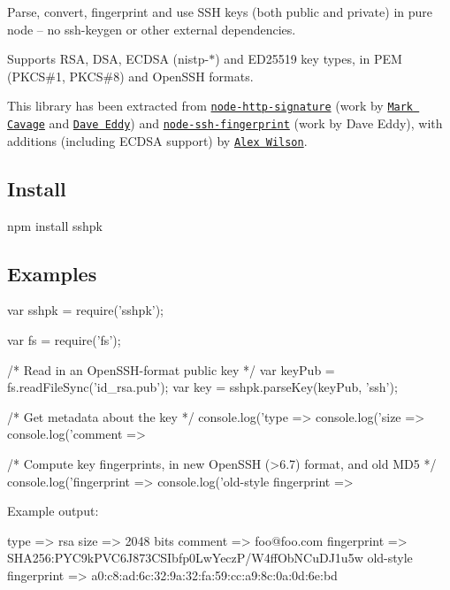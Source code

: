 Parse, convert, fingerprint and use S\+SH keys (both public and private) in pure node -- no {\ttfamily ssh-\/keygen} or other external dependencies.

Supports R\+SA, D\+SA, E\+C\+D\+SA (nistp-\/$\ast$) and E\+D25519 key types, in P\+EM (P\+K\+CS\#1, P\+K\+CS\#8) and Open\+S\+SH formats.

This library has been extracted from \href{https://github.com/joyent/node-http-signature}{\tt {\ttfamily node-\/http-\/signature}} (work by \href{https://github.com/mcavage}{\tt Mark Cavage} and \href{https://github.com/bahamas10}{\tt Dave Eddy}) and \href{https://github.com/bahamas10/node-ssh-fingerprint}{\tt {\ttfamily node-\/ssh-\/fingerprint}} (work by Dave Eddy), with additions (including E\+C\+D\+SA support) by \href{https://github.com/arekinath}{\tt Alex Wilson}.

\subsection*{Install }


\begin{DoxyCode}
npm install sshpk
\end{DoxyCode}


\subsection*{Examples }


\begin{DoxyCode}
var sshpk = require('sshpk');

var fs = require('fs');

/* Read in an OpenSSH-format public key */
var keyPub = fs.readFileSync('id\_rsa.pub');
var key = sshpk.parseKey(keyPub, 'ssh');

/* Get metadata about the key */
console.log('type => %
console.log('size => %
console.log('comment => %

/* Compute key fingerprints, in new OpenSSH (>6.7) format, and old MD5 */
console.log('fingerprint => %
console.log('old-style fingerprint => %
\end{DoxyCode}


Example output\+:


\begin{DoxyCode}
type => rsa
size => 2048 bits
comment => foo@foo.com
fingerprint => SHA256:PYC9kPVC6J873CSIbfp0LwYeczP/W4ffObNCuDJ1u5w
old-style fingerprint => a0:c8:ad:6c:32:9a:32:fa:59:cc:a9:8c:0a:0d:6e:bd
\end{DoxyCode}


